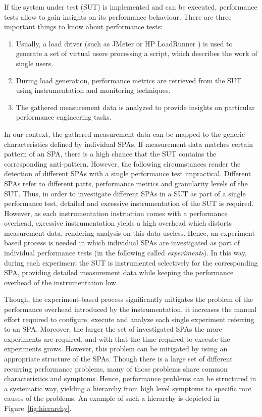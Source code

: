 \documentclass{report}
\begin{document}
If the system under test (SUT) is implemented and can be executed, performance tests allow to
gain insights on its performance behaviour. There are three important things to know about performance tests: 
\begin{enumerate}
  \item Usually, a load driver (such as JMeter\texttrademark \cite{jmeter} or HP LoadRunner \cite{loadrunner}) is used to
generate a set of virtual users processing a script, which describes the work of single users. 
  \item  During
load generation, performance metrics are retrieved from the SUT using instrumentation and monitoring techniques. 
  \item The gathered measurement data is analyzed to provide insights on particular performance engineering tasks.
\end{enumerate}
In our context, the gathered measurement data can be mapped to the
generic characteristics defined by individual SPAs. If measurement data matches certain pattern of an SPA, there is a
high chance that the SUT contains the corresponding anti-pattern. 
However, the following circumstances render the detection of different SPAs with a single performance test impractical.
Different SPAs refer to different parts, performance metrics and granularity levels of the SUT. Thus, in order
to investigate different SPAs in a SUT as part of a single performance test, detailed and excessive instrumentation of
the SUT is required.
However, as each instrumentation instruction comes with a performance overhead, excessive instrumentation yields a
high overhead which distorts measurement data, rendering analysis on this data useless. Hence, an experiment-based
process is needed in which individual SPAs are investigated as part of individual performance tests (in the following
called \emph{experiments}). In this way, during each experiment the SUT is instrumented selectively for the
corresponding SPA, providing detailed measurement data while keeping the performance overhead of the instrumentation
low. 

Though, the experiment-based process significantly mitigates the problem of the performance overhead introduced by the
instrumentation, it increases the manual effort required to configure, execute and analyze each single experiment
referring to an SPA. Moreover, the larger the set of investigated SPAs the more experiments are required, and with that
the time required to execute the experiments grows. However, this problem can be mitigated by using an appropriate
structure of the SPAs. Though there is a large set of different recurring performance problems, many of those problems
share common characteristics and symptoms. Hence, performance problems can be structured in a systematic way, yielding a
hierarchy from high level symptoms to specific root causes of the problems. 
An example of such a hierarchy is depicted in Figure~\ref{fig:hierarchy}.
\end{document}
